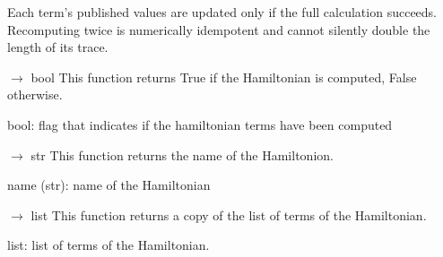 \documentclass[letterpaper,10pt,english]{sphinxmanual}
\begin{document}
\begin{fulllineitems}
\begin{fulllineitems}
\sphinxAtStartPar
Each term’s published values are updated only if the full
calculation succeeds. Recomputing twice is numerically idempotent
and cannot silently double the length of its trace.

\end{fulllineitems}


\begin{fulllineitems}
\label{\detokenize{scrimp:scrimp.hamiltonian.Hamiltonian.get_is_computed}}
\pysigstartsignatures
\pysiglinewithargsret
{}
{}
{{ $\rightarrow$ bool}}
\pysigstopsignatures
\sphinxAtStartPar
This function returns True if the Hamiltonian is computed, False otherwise.
\begin{description}
\sphinxAtStartPar
bool: flag that indicates if the hamiltonian terms have been computed

\end{description}

\end{fulllineitems}


\begin{fulllineitems}
\label{\detokenize{scrimp:scrimp.hamiltonian.Hamiltonian.get_name}}
\pysigstartsignatures
\pysiglinewithargsret
{}
{}
{{ $\rightarrow$ str}}
\pysigstopsignatures
\sphinxAtStartPar
This function returns the name of the Hamiltonion.
\begin{description}
\sphinxAtStartPar
name (str): name of the Hamiltonian

\end{description}

\end{fulllineitems}


\begin{fulllineitems}
\label{\detokenize{scrimp:scrimp.hamiltonian.Hamiltonian.get_terms}}
\pysigstartsignatures
\pysiglinewithargsret
{}
{}
{{ $\rightarrow$ list}}
\pysigstopsignatures
\sphinxAtStartPar
This function returns a copy of the list of terms of the Hamiltonian.
\begin{description}
\sphinxAtStartPar
list: list of terms of the Hamiltonian.


\end{description}
\end{fulllineitems}
\end{fulllineitems}
\end{document}
